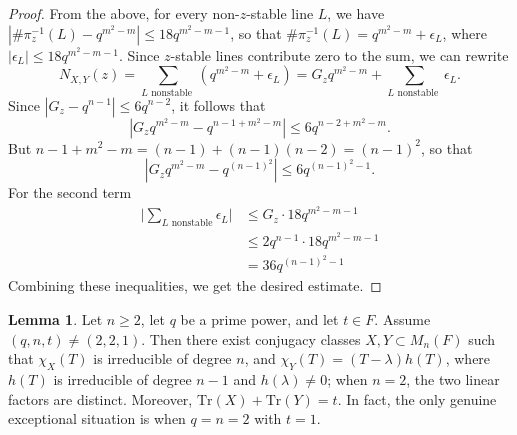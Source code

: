 \documentclass[preprint,11pt]{amsart}
\theoremstyle{definition}
\numberwithin{thm}{section}
\newtheorem{lem}[thm]{Lemma}
\newcommand{\eps}{\epsilon}
\newcommand{\abs}[1]{\left| #1 \right|}
\newcommand{\trm}[1]{\textrm{#1}}
\newcommand{\tr}{\textrm{Tr}}
\newcommand{\sub}{\subset}
\begin{document}
\begin{proof}
From the above, for every non-$z$-stable line $L$, we have $\abs{\# \pi_z^{-1}(L)  - q^{m^2 -m}} \leq 18q^{m^2 - m -1}$, so that $\#\pi_z^{-1}(L) = q^{m^2 - m} + \eps_L$, where $\abs{\eps_L} \leq 18 q^{m^2 - m -1}$. Since $z$-stable lines contribute zero to the sum, we can rewrite 
$$
N_{X, Y}(z) = \sum_{L \trm{ nonstable }} (q^{m^2 - m} + \eps_L) = G_z q^{m^2 - m} + \sum_{L \trm{ nonstable }} \eps_L.
$$
Since $\abs{G_z - q^{n-1}} \leq 6 q^{n-2}$, it follows that 
$$
\abs{G_z q^{m^2 - m} - q^{n-1 + m^2 - m}} \leq 6 q^{n-2 + m^2 - m}.
$$
But $n-1 + m^2 - m = (n-1) + (n-1) (n-2) = (n-1)^2$, so that 
$$
\abs{G_z q^{m^2 - m} - q^{(n-1)^2}} \leq 6 q^{(n-1)^2 - 1}.
$$
For the second term
\begin{align*}
\big|\sum_{L \trm{ nonstable} } \eps_L \big| &\leq  G_z \cdot 18 q^{m^2 - m -1} \\
&\leq 2 q^{n-1}  \cdot 18 q^{m^2 - m -1} \\
&= 36 q^{(n-1)^2 -1}
\end{align*}
Combining these inequalities, we get the desired estimate.



\end{proof}



\begin{lem}\label{tracerealization}
Let $n \geq 2$, let $q$ be a prime power, and let $t \in F$. Assume $(q,n,t) \neq (2,2,1)$. Then there exist conjugacy classes $X, Y \sub M_n(F)$ such that $\chi_X(T)$ is irreducible of degree $n$, and $\chi_Y(T) = (T - \lambda) h(T)$, where $h(T)$ is irreducible of degree $n-1$ and $h(\lambda) \neq 0$; when $n = 2$, the two linear factors are distinct. Moreover, $\tr(X) + \tr(Y) = t$. In fact, the only genuine exceptional situation is when $q = n = 2$ with $t = 1$.
\end{lem}
\end{document}
